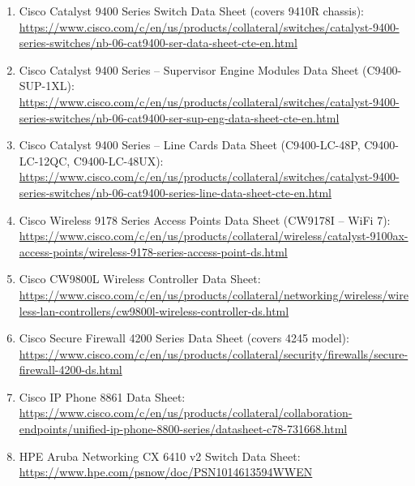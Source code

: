 \documentclass[12pt,a4paper]{report}
\begin{document}
\begin{enumerate}

  \item Cisco Catalyst 9400 Series Switch Data Sheet (covers 9410R chassis):\\
    \url{https://www.cisco.com/c/en/us/products/collateral/switches/catalyst-9400-series-switches/nb-06-cat9400-ser-data-sheet-cte-en.html}

  \item Cisco Catalyst 9400 Series -- Supervisor Engine Modules Data Sheet (C9400-SUP-1XL):\\
    \url{https://www.cisco.com/c/en/us/products/collateral/switches/catalyst-9400-series-switches/nb-06-cat9400-ser-sup-eng-data-sheet-cte-en.html}

  \item Cisco Catalyst 9400 Series -- Line Cards Data Sheet (C9400-LC-48P, C9400-LC-12QC, C9400-LC-48UX):\\
    \url{https://www.cisco.com/c/en/us/products/collateral/switches/catalyst-9400-series-switches/nb-06-cat9400-series-line-data-sheet-cte-en.html}

  \item Cisco Wireless 9178 Series Access Points Data Sheet (CW9178I -- WiFi 7):\\
    \url{https://www.cisco.com/c/en/us/products/collateral/wireless/catalyst-9100ax-access-points/wireless-9178-series-access-point-ds.html}

  \item Cisco CW9800L Wireless Controller Data Sheet:\\
    \url{https://www.cisco.com/c/en/us/products/collateral/networking/wireless/wireless-lan-controllers/cw9800l-wireless-controller-ds.html}

  \item Cisco Secure Firewall 4200 Series Data Sheet (covers 4245 model):\\
    \url{https://www.cisco.com/c/en/us/products/collateral/security/firewalls/secure-firewall-4200-ds.html}

  \item Cisco IP Phone 8861 Data Sheet:\\
    \url{https://www.cisco.com/c/en/us/products/collateral/collaboration-endpoints/unified-ip-phone-8800-series/datasheet-c78-731668.html}

  \item HPE Aruba Networking CX 6410 v2 Switch Data Sheet:\\
    \url{https://www.hpe.com/psnow/doc/PSN1014613594WWEN}


\end{enumerate}
\end{document}
